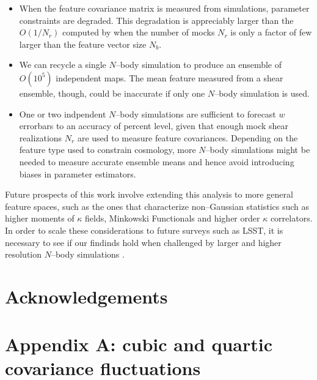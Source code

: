 \documentclass[reprint,aps,prd,superscriptaddress,showkeys,showpacs]{revtex4-1}
\begin{document}
\begin{itemize}
\item When the feature covariance matrix is measured from simulations, parameter constraints are degraded. This degradation is appreciably larger than the $O(1/N_r)$ computed by \citep{DodelsonSchneider13} when the number of mocks $N_r$ is only a factor of few larger than the feature vector size $N_b$.
\item We can recycle a single $N$--body simulation to produce an ensemble of $O(10^5)$ independent maps. The mean feature measured from a shear ensemble, though, could be inaccurate if only one $N$--body simulation is used.   
\item One or two indpendent $N$--body simulations are sufficient to forecast $w$ errorbars to an accuracy of percent level, given that enough mock shear realizations $N_r$ are used to measure feature covariances. Depending on the feature type used to constrain cosmology, more $N$--body simulations might be needed to measure accurate ensemble means and hence avoid introducing biases in parameter estimators.   
\end{itemize}
%
Future prospects of this work involve extending this analysis to more general feature spaces, such as the ones that characterize non--Gaussian statistics such as higher moments of $\kappa$ fields, Minkowski Functionals and higher order $\kappa$ correlators. In order to scale these considerations to future surveys such as LSST, it is necessary to see if our findinds hold when challenged by larger and higher resolution $N$--body simulations \citep{Qcontinuum}.   

 

\section*{Acknowledgements}



\section*{Appendix A: cubic and quartic covariance fluctuations}
\label{appendixA}
\end{document}

